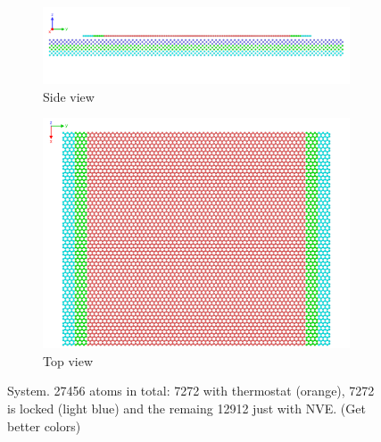 \begin{figure}[H]
  \centering
  \begin{subfigure}[b]{0.80\textwidth}
      \centering
      \includegraphics[width=\textwidth]{figures/system_sideview.png}
      \caption{Side view}
      \label{fig:sideview}
  \end{subfigure}
  \hfill
  \begin{subfigure}[b]{0.80\textwidth}
      \centering
      \includegraphics[width=\textwidth]{figures/system_topview.png}
      \caption{Top view}
      \label{fig:topview}
  \end{subfigure}
  \hfill
     \caption{System. 27456 atoms in total: 7272 with thermostat (orange), 7272 is locked (light blue) and the remaing 12912 just with NVE. (Get better colors)}
     \label{fig:system}
\end{figure}





